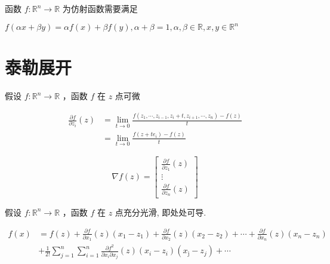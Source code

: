 \begin{theorem}
    函数 $ f: \mathbb{R}^{n} \rightarrow \mathbb{R} $ 为仿射函数需要满足

$ f(\alpha x+\beta y)=\alpha f(x)+\beta f(y), \alpha+\beta=1, \alpha, \beta \in \mathbb{R}, x, y \in \mathbb{R}^{n} $
\end{theorem}

\section{泰勒展开}

\begin{definition}[函数$f$第$i$个分量的一阶偏导数]
    假设 $ f: \mathbb{R}^{n} \rightarrow \mathbb{R} $ ，函数 $ f $ 在 $ z $ 点可微

    $$ \begin{aligned} \frac{\partial f}{\partial z_{i}}(z) &=\lim _{t \rightarrow 0} \frac{f\left(z_{1}, \cdots, z_{i-1}, z_{i}+t, z_{i+1}, \cdots, z_{n}\right)-f(z)}{t} \\ &=\lim _{t \rightarrow 0} \frac{f\left(z+t e_{i}\right)-f(z)}{t} \end{aligned} $$
\end{definition}

\begin{definition}[$f$在点$z$的梯度]
    $$ \nabla f(z)=\left[\begin{array}{c}\frac{\partial f}{\partial z_{1}}(z) \\ \vdots \\ \frac{\partial f}{\partial z_{n}}(z)\end{array}\right] $$
\end{definition}

\begin{definition}
    假设 $ f: \mathbb{R}^{n} \rightarrow \mathbb{R} $ ，函数 $ f $ 在 $ z $ 点充分光滑, 即处处可导.

    $$\begin{aligned} f(x)&=f(z)+\frac{\partial f}{\partial x_{1}}(z)\left(x_{1}-z_{1}\right)+\frac{\partial f}{\partial x_{2}}(z)\left(x_{2}-z_{2}\right)+\cdots+\frac{\partial f}{\partial x_{n}}(z)\left(x_{n}-z_{n}\right) 
    \\ & +\frac{1}{2 !} \sum_{j=1}^{n} \sum_{i=1}^{n} \frac{\partial f^{2}}{\partial x_{i} \partial x_{j}}(z)\left(x_{i}-z_{i}\right)\left(x_{\mathrm{j}}-z_{j}\right)+\cdots \end{aligned}$$
\end{definition}

